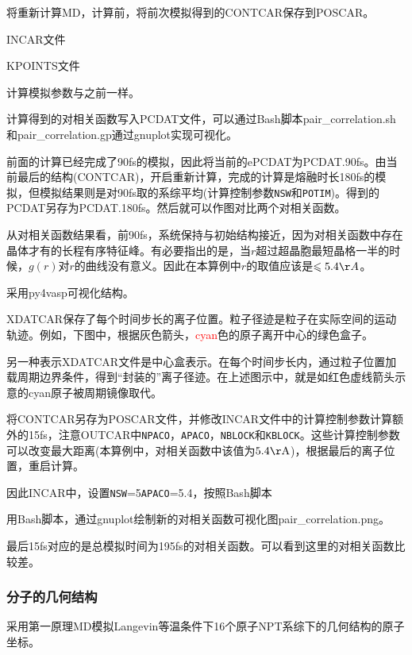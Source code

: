 将重新计算\textrm{MD}，计算前，将前次模拟得到的\textrm{CONTCAR}保存到\textrm{POSCAR}。

\textrm{INCAR}文件

\textrm{KPOINTS}文件

计算模拟参数与之前一样。

计算得到的对相关函数写入\textrm{PCDAT}文件，可以通过\textrm{Bash}脚本\textrm{pair\_correlation.sh}和\textrm{pair\_correlation.gp}通过\textrm{gnuplot}实现可视化。

前面的计算已经完成了\textrm{90fs}的模拟，因此将当前的e\textrm{PCDAT}为\textrm{PCDAT.90fs}。由当前最后的结构\textrm{(CONTCAR)}，开启重新计算，完成的计算是熔融时长\textrm{180fs}的模拟，但模拟结果则是对\textrm{90fs}取的系综平均(计算控制参数\texttt{NSW}和\texttt{POTIM})。得到的\textrm{PCDAT}另存为\textrm{PCDAT.180fs}。然后就可以作图对比两个对相关函数。

从对相关函数结果看，前\textrm{90fs}，系统保持与初始结构接近，因为对相关函数中存在晶体才有的长程有序特征峰。有必要指出的是，当$r$超过超晶胞最短晶格一半的时候，$g(r)$对$r$的曲线没有意义。因此在本算例中$r$的取值应该是$\leqslant 5.4\AA$。

采用\textrm{py4vasp}可视化结构。

\textrm{XDATCAR}保存了每个时间步长的离子位置。粒子径迹是粒子在实际空间的运动轨迹。例如，下图中，根据灰色箭头，\textcolor{red}{cyan}色的原子离开中心的绿色盒子。

另一种表示\textrm{XDATCAR}文件是中心盒表示。在每个时间步长内，通过粒子位置加载周期边界条件，得到``封装的''离子径迹。在上述图示中，就是如红色虚线箭头示意的\textrm{cyan}原子被周期镜像取代。

将\textrm{CONTCAR}另存为\textrm{POSCAR}文件，并修改\textrm{INCAR}文件中的计算控制参数计算额外的\textrm{15fs}，注意\textrm{OUTCAR}中\texttt{NPACO}，\texttt{APACO}，\texttt{NBLOCK}和\texttt{KBLOCK}。这些计算控制参数可以改变最大距离(本算例中，对相关函数中该值为$5.4\mathrm{\AA}$)，根据最后的离子位置，重启计算。

因此\textrm{INCAR}中，设置\texttt{NSW}=5\texttt{APACO}=5.4，按照\textrm{Bash}脚本

用\textrm{Bash}脚本，通过\textrm{gnuplot}绘制新的对相关函数可视化图\textrm{pair\_correlation.png}。

最后\textrm{15fs}对应的是总模拟时间为\textrm{195fs}的对相关函数。可以看到这里的对相关函数比较差。

\subsubsection{分子的几何结构}
采用第一原理\textrm{MD}模拟\textrm{Langevin}等温条件下16个原子\textrm{NPT}系综下的几何结构的原子坐标。

